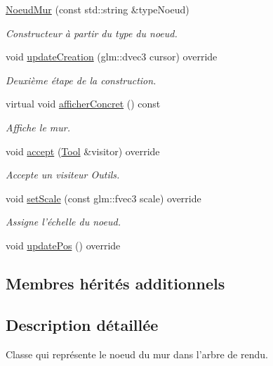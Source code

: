 \begin{DoxyCompactItemize}
\item 
\hyperlink{class_noeud_mur_aeab2deec90548c0bdca5eb86beb629cf}{Noeud\-Mur} (const std\-::string \&type\-Noeud)
\begin{DoxyCompactList}\small\item\em Constructeur à partir du type du noeud. \end{DoxyCompactList}\item 
void \hyperlink{class_noeud_mur_a9f86d3ce3675f79abe879143e6dd4e8b}{update\-Creation} (glm\-::dvec3 cursor) override
\begin{DoxyCompactList}\small\item\em Deuxième étape de la construction. \end{DoxyCompactList}\item 
virtual void \hyperlink{class_noeud_mur_a521a3062875ea6ed1645485412a70c7b}{afficher\-Concret} () const 
\begin{DoxyCompactList}\small\item\em Affiche le mur. \end{DoxyCompactList}\item 
\hypertarget{class_noeud_mur_a267fe3fba8110e59fa76412f788ea8d1}{void \hyperlink{class_noeud_mur_a267fe3fba8110e59fa76412f788ea8d1}{accept} (\hyperlink{class_tool}{Tool} \&visitor) override}\label{class_noeud_mur_a267fe3fba8110e59fa76412f788ea8d1}

\begin{DoxyCompactList}\small\item\em Accepte un visiteur Outils. \end{DoxyCompactList}\item 
void \hyperlink{class_noeud_mur_a8934e4b68543af4da6f06895ec91d9ef}{set\-Scale} (const glm\-::fvec3 scale) override
\begin{DoxyCompactList}\small\item\em Assigne l'échelle du noeud. \end{DoxyCompactList}\item 
void \hyperlink{class_noeud_mur_aa59a799513cfb2bd97de7b48e4edec14}{update\-Pos} () override
\end{DoxyCompactItemize}

\subsection*{Membres hérités additionnels}


\subsection{Description détaillée}
Classe qui représente le noeud du mur dans l'arbre de rendu. 

